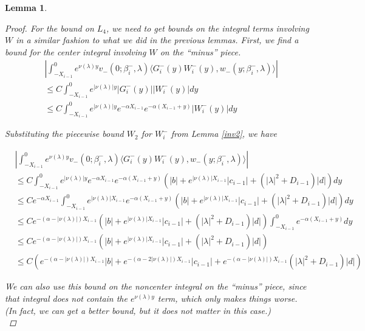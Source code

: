 \documentclass[12pt]{article}
\newtheorem{lemma}{Lemma}
\begin{document}
\begin{lemma}
\begin{proof}
For the bound on $L_4$, we need to get bounds on the integral terms involving $W$ in a similar fashion to what we did in the previous lemmas. First, we find a bound for the center integral involving $W$ on the ``minus'' piece.\\

\begin{align*}
&\left| \int_{-X_{i-1}}^0
e^{\nu(\lambda)y} v_-(0; \beta_i^-, \lambda) \langle G_i^-(y)W_i^-(y), w_-(y; \beta_i^-, \lambda) \rangle \right| \\
&\leq C \int_{-X_{i-1}}^0 e^{|\nu(\lambda)|y} |G_i^-(y)| |W_i^-(y)| dy \\
&\leq C \int_{-X_{i-1}}^0 e^{|\nu(\lambda)|y} e^{-\alpha X_{i-1}} e^{-\alpha(X_{i-1} + y)} |W_i^-(y)| dy
\end{align*}

Substituting the piecewise bound $W_2$ for $W_i^-$ from Lemma \ref{inv2}, we have

\begin{align*}
&\left| \int_{-X_{i-1}}^0
e^{\nu(\lambda)y} v_-(0; \beta_i^-, \lambda) \langle G_i^-(y)W_i^-(y), w_-(y; \beta_i^-, \lambda) \rangle \right| \\
&\leq C \int_{-X_{i-1}}^0 e^{|\nu(\lambda)|y} e^{-\alpha X_{i-1}} e^{-\alpha(X_{i-1} + y)} ( |b| + e^{|\nu(\lambda)|X_{i-1}}|c_{i-1}| + (|\lambda|^2 + D_{i-1})|d| )dy \\
&\leq C e^{-\alpha X_{i-1}} \int_{-X_{i-1}}^0 e^{|\nu(\lambda)|X_{i-1}} e^{-\alpha(X_{i-1} + y)} ( |b| + e^{|\nu(\lambda)|X_{i-1}}|c_{i-1}| + (|\lambda|^2 + D_{i-1})|d| )dy \\
&\leq C e^{-(\alpha - |\nu(\lambda)|) X_{i-1}} ( |b| + e^{|\nu(\lambda)|X_{i-1}}|c_{i-1}| + (|\lambda|^2 + D_{i-1})|d| ) \int_{-X_{i-1}}^0 e^{-\alpha(X_{i-1} + y)} dy \\
&\leq C e^{-(\alpha - |\nu(\lambda)|) X_{i-1}} ( |b| + e^{|\nu(\lambda)|X_{i-1}}|c_{i-1}| + (|\lambda|^2 + D_{i-1})|d| ) \\
&\leq C ( e^{-(\alpha - |\nu(\lambda)|) X_{i-1}} |b| + e^{-(\alpha - 2 |\nu(\lambda)|) X_{i-1}}|c_{i-1}| + e^{-(\alpha - |\nu(\lambda)|) X_{i-1}} (|\lambda|^2 + D_{i-1})|d| )
\end{align*}

We can also use this bound on the noncenter integral on the ``minus'' piece, since that integral does not contain the $e^{\nu(\lambda)y}$ term, which only makes things worse. (In fact, we can get a better bound, but it does not matter in this case.)\\


\end{proof}
\end{lemma}
\end{document}
